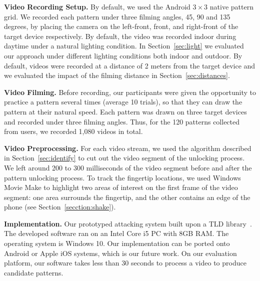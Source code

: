     \vspace{2mm}
   \noindent\textbf{Video Recording Setup.}
    By default, we used the  Android $3 \times 3$ native pattern grid.
    We recorded each pattern under three filming
    angles, 45, 90 and 135 degrees, by placing the camera on the left-front, front, and right-front
    of the target device respectively.
    By default, the video
    was recorded indoor during daytime under a natural lighting condition. In
    Section~\ref{sec:light} we evaluated our approach under different lighting conditions
    both indoor and outdoor. By default, videos were recorded at a distance of
    2 meters from the target device and we evaluated the impact of the filming distance in
    Section~\ref{sec:distances}.

    \vspace{2mm}
    \noindent \textbf{Video Filming.}
     Before recording, our participants were given the opportunity to practice a pattern
    several times (average 10 trials), so that they can draw the pattern at
    their natural speed. 
    Each pattern was drawn on three target devices and
    recorded under three filming angles.
    Thus, for the 120 patterns collected from users, we recorded 1,080 videos in total.

    \vspace{2mm}
    \noindent\textbf{Video Preprocessing.}
    For each video stream, we used the algorithm described in Section~\ref{sec:identify} to cut out the video segment
    of the unlocking process. We left around 200 to 300 milliseconds of the video segment before and after the pattern unlocking process.
    To track the fingertip locations,
    we used Windows Movie Make to highlight two areas of interest on the first frame of
    the video segment: one area surrounds the fingertip, and the other contains an edge of the
    phone (see Section~\ref {secction:shake}).

    \vspace{2mm}
   \noindent\textbf{Implementation.} Our prototyped attacking system built upon a TLD library~\cite{TLD-toolbox-web}.
    The developed software ran on an Intel Core i5 PC with
    8GB RAM. The operating system is Windows 10. Our implementation can be ported onto
    Android or Apple iOS systems, which is our future work. On our evaluation
    platform, our software takes less than 30 seconds to process a video to produce candidate patterns.
